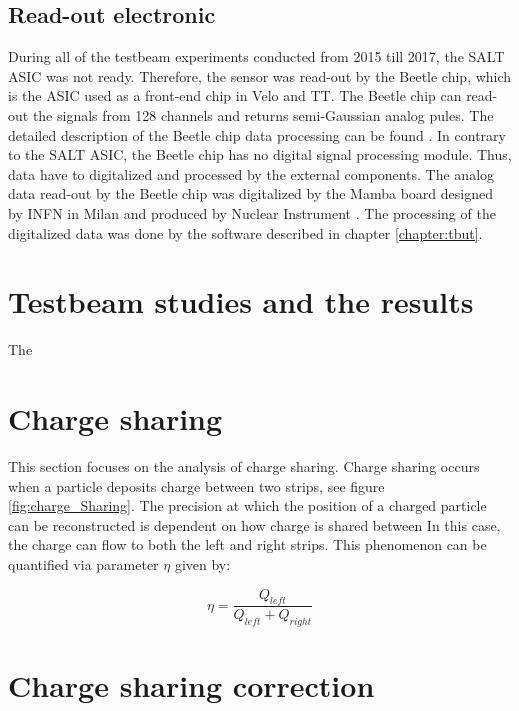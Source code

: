 \subsection{Read-out electronic}
During all of the testbeam experiments conducted from 2015 till 2017, the SALT ASIC was not ready. Therefore, the sensor was read-out by the Beetle chip, which is the ASIC used as a front-end chip in Velo and TT. The Beetle chip can read-out the signals from 128 channels and returns semi-Gaussian analog pules.  The detailed description of the Beetle chip data processing can be found \cite{Beetle}.  In contrary to the SALT ASIC, the Beetle chip has no digital signal processing module. Thus, data have to digitalized and processed by the external components.  
The analog data read-out by the Beetle chip was digitalized by the Mamba board designed by INFN in Milan and produced by Nuclear Instrument \cite{}.   
The processing of the digitalized data was done by the software described in chapter \ref{chapter:tbut}. 

\section{Testbeam studies and the results}
The 

\section{Charge sharing}
This section focuses on the analysis of charge sharing. Charge sharing occurs when a particle deposits charge between two strips, see figure \ref{fig:charge_Sharing}. The precision at which the position of a charged particle can be reconstructed is dependent on how charge is shared between
In this case, the charge can flow to both the left and right strips.  
This phenomenon can be quantified via parameter $\eta$ given by:

\begin{equation}
    \eta = \frac{Q_{left}}{Q_{left}+Q_{right}}
\end{equation}


\section{Charge sharing correction}
